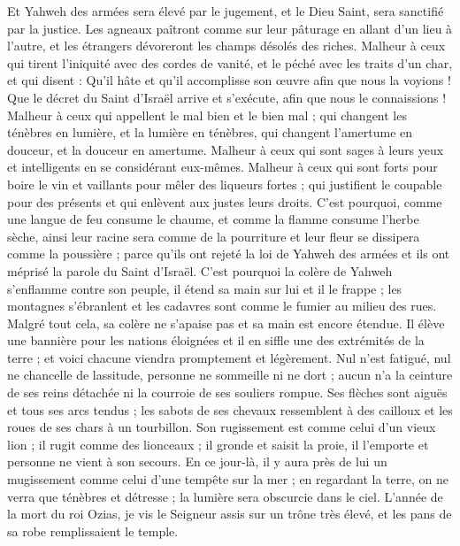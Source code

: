 \begin{multicols}{2}
Et Yahweh des armées sera élevé par le jugement, et le Dieu Saint, sera sanctifié par la justice.
Les agneaux paîtront comme sur leur pâturage en allant d'un lieu à l'autre, et les étrangers dévoreront les champs désolés des riches.
Malheur à ceux qui tirent l'iniquité avec des cordes de vanité, et le péché avec les traits d'un char,
et qui disent : Qu'il hâte et qu'il accomplisse son œuvre afin que nous la voyions ! Que le décret du Saint d'Israël arrive et s'exécute, afin que nous le connaissions !
Malheur à ceux qui appellent le mal bien et le bien mal ; qui changent les ténèbres en lumière, et la lumière en ténèbres, qui changent l'amertume en douceur, et la douceur en amertume.
Malheur à ceux qui sont sages à leurs yeux et intelligents en se considérant eux-mêmes.
Malheur à ceux qui sont forts pour boire le vin et vaillants pour mêler des liqueurs fortes ;
qui justifient le coupable pour des présents et qui enlèvent aux justes leurs droits.
C'est pourquoi, comme une langue de feu consume le chaume, et comme la flamme consume l'herbe sèche, ainsi leur racine sera comme de la pourriture et leur fleur se dissipera comme la poussière ; parce qu'ils ont rejeté la loi de Yahweh des armées et ils ont méprisé la parole du Saint d'Israël.
C'est pourquoi la colère de Yahweh s'enflamme contre son peuple, il étend sa main sur lui et il le frappe ; les montagnes s'ébranlent et les cadavres sont comme le fumier au milieu des rues. Malgré tout cela, sa colère ne s'apaise pas et sa main est encore étendue.
Il élève une bannière pour les nations éloignées et il en siffle une des extrémités de la terre ; et voici chacune viendra promptement et légèrement.
Nul n'est fatigué, nul ne chancelle de lassitude, personne ne sommeille ni ne dort ; aucun n'a la ceinture de ses reins détachée ni la courroie de ses souliers rompue.
Ses flèches sont aiguës et tous ses arcs tendus ; les sabots de ses chevaux ressemblent à des cailloux et les roues de ses chars à un tourbillon.
Son rugissement est comme celui d'un vieux lion ; il rugit comme des lionceaux ; il gronde et saisit la proie, il l'emporte et personne ne vient à son secours.
En ce jour-là, il y aura près de lui un mugissement comme celui d'une tempête sur la mer ; en regardant la terre, on ne verra que ténèbres et détresse ; la lumière sera obscurcie dans le ciel.
\VerseOne{}L'année de la mort du roi Ozias, je vis le Seigneur assis sur un trône très élevé, et les pans de sa robe remplissaient le temple.

\end{multicols}
